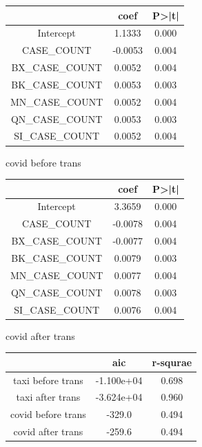 \documentclass[11pt]{article}
\begin{document}
\begin{figure}[H]
  \begin{minipage}[b]{0.5\textwidth} 
    \centering
    \begin{tabular}{c|c|c} \hline
    & coef & P\textgreater\left|t\right| \\ \hline
    Intercept & 1.1333 & 0.000 \\      
    CASE\_COUNT & -0.0053 & 0.004 \\     
    BX\_CASE\_COUNT & 0.0052 & 0.004 \\      
    BK\_CASE\_COUNT & 0.0053 & 0.003 \\     
    MN\_CASE\_COUNT & 0.0052 & 0.004 \\      
    QN\_CASE\_COUNT & 0.0053 & 0.003 \\      
    SI\_CASE\_COUNT & 0.0052 & 0.004 \\     
    \hline
    \end{tabular} 
    \caption{covid before trans}
    \label{tab:my_label}
  \end{minipage}%
  \begin{minipage}[b]{0.5\textwidth} 
    \centering 
    \begin{tabular}{c|c|c} \hline
    & coef & P\textgreater\left|t\right| \\ \hline
    Intercept & 3.3659 & 0.000 \\      
    CASE\_COUNT & -0.0078 & 0.004 \\     
    BX\_CASE\_COUNT & -0.0077 & 0.004 \\      
    BK\_CASE\_COUNT & 0.0079 & 0.003 \\     
    MN\_CASE\_COUNT & 0.0077 & 0.004 \\      
    QN\_CASE\_COUNT & 0.0078 & 0.003 \\      
    SI\_CASE\_COUNT & 0.0076 & 0.004 \\  
    \hline
    \end{tabular} 
    \caption{covid after trans}
    \label{tab:my_label}
\end{minipage} 
\end{figure}
\begin{figure}
    \centering
    \begin{tabular}{c|c|c} \\ \hline
    & aic & r-squrae \\ \hline
    taxi before trans & -1.100e+04 & 0.698 \\
    taxi after trans & -3.624e+04 & 0.960 \\
    covid before trans & -329.0 & 0.494 \\
    covid after trans & -259.6 & 0.494 \\
    \hline
    \end{tabular}
    \caption{}
    \label{fig:my_label}
\end{figure}
\end{document}

